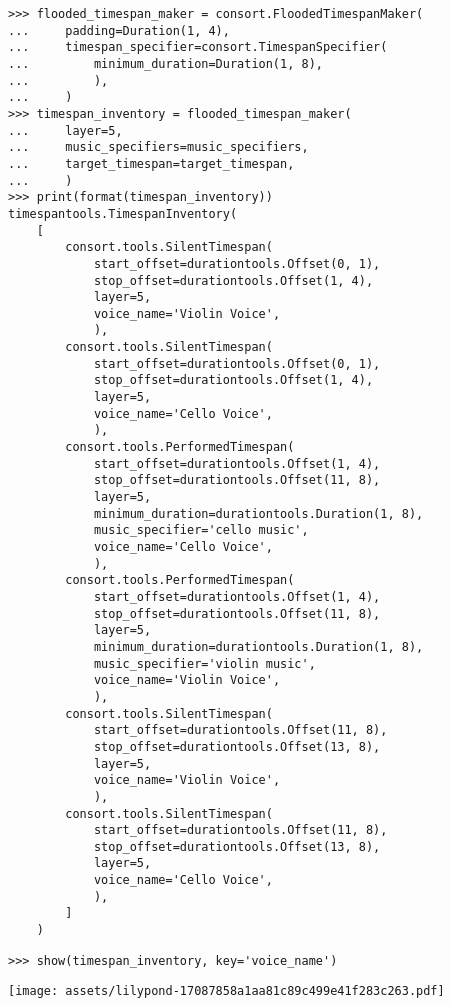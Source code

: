 \begin{abjadbookoutput}
\begin{singlespacing}
\vspace{-0.5\baselineskip}
\begin{lstlisting}
>>> flooded_timespan_maker = consort.FloodedTimespanMaker(
...     padding=Duration(1, 4),
...     timespan_specifier=consort.TimespanSpecifier(
...         minimum_duration=Duration(1, 8),
...         ),
...     )
>>> timespan_inventory = flooded_timespan_maker(
...     layer=5,
...     music_specifiers=music_specifiers,
...     target_timespan=target_timespan,
...     )
>>> print(format(timespan_inventory))
timespantools.TimespanInventory(
    [
        consort.tools.SilentTimespan(
            start_offset=durationtools.Offset(0, 1),
            stop_offset=durationtools.Offset(1, 4),
            layer=5,
            voice_name='Violin Voice',
            ),
        consort.tools.SilentTimespan(
            start_offset=durationtools.Offset(0, 1),
            stop_offset=durationtools.Offset(1, 4),
            layer=5,
            voice_name='Cello Voice',
            ),
        consort.tools.PerformedTimespan(
            start_offset=durationtools.Offset(1, 4),
            stop_offset=durationtools.Offset(11, 8),
            layer=5,
            minimum_duration=durationtools.Duration(1, 8),
            music_specifier='cello music',
            voice_name='Cello Voice',
            ),
        consort.tools.PerformedTimespan(
            start_offset=durationtools.Offset(1, 4),
            stop_offset=durationtools.Offset(11, 8),
            layer=5,
            minimum_duration=durationtools.Duration(1, 8),
            music_specifier='violin music',
            voice_name='Violin Voice',
            ),
        consort.tools.SilentTimespan(
            start_offset=durationtools.Offset(11, 8),
            stop_offset=durationtools.Offset(13, 8),
            layer=5,
            voice_name='Violin Voice',
            ),
        consort.tools.SilentTimespan(
            start_offset=durationtools.Offset(11, 8),
            stop_offset=durationtools.Offset(13, 8),
            layer=5,
            voice_name='Cello Voice',
            ),
        ]
    )
\end{lstlisting}
\begin{lstlisting}
>>> show(timespan_inventory, key='voice_name')
\end{lstlisting}
\noindent\texttt{[image: assets/lilypond-17087858a1aa81c89c499e41f283c263.pdf]}
\end{singlespacing}
\end{abjadbookoutput}

